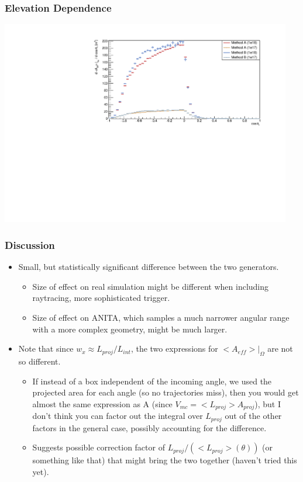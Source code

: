 \documentclass[hyperref={pdfpagelabels=false},aspectratio=169]{beamer} \mode<presentation> { \usetheme{Boadilla} }
\begin{document}
\begin{frame}
  \frametitle{Elevation Dependence} 
  \centering
  \includegraphics[width=5in]{theta18}
\end{frame} 


\begin{frame}
  \frametitle{Discussion}
  \begin{itemize}
    \item Small, but statistically significant difference between the two generators. 
      \begin{itemize} 
       \item Size of effect on real simulation might be different when including raytracing, more sophisticated trigger.
       \item Size of effect on ANITA, which samples a much narrower angular range with a more complex geometry, might be much larger. 
     \end{itemize} 
    \item Note that since $w_{x} \approx  L_{proj} /L_{int}$, the two expressions for $<A_{eff}>|_{\Omega}$ are not so different. 
    \begin{itemize} 
      \item If instead of a box independent of the incoming angle, we used the projected area for each angle (so no trajectories miss), then you would get almost the same expression as A (since $V_{mc} = <L_{proj}> A_{proj}$), but I don't think you can factor out the integral over $L_{proj}$ out of the other factors in the general case, possibly accounting for the difference.
      \item Suggests possible correction factor of $L_{proj}/ (<L_{proj}>(\theta))$ (or something like that) that might bring the two together (haven't tried this yet). 
    \end{itemize}
\end{itemize} 
\end{frame}
\end{document}
